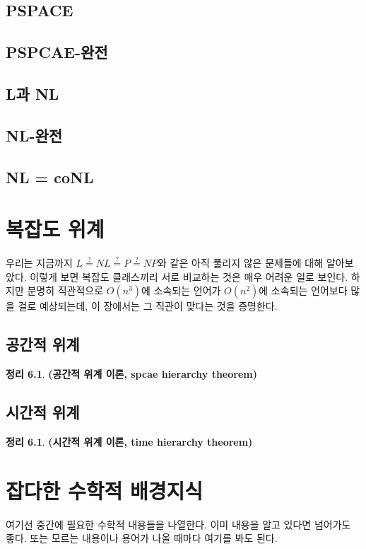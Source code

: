 \documentclass[b5paper, 10pt]{book}
\theoremstyle{definition}
\newtheorem{thm}[defn]{정리}
\newenvironment{pf*}{\pushQED{\qed}\pf}{\popQED\endpf}
\begin{document}
\section{PSPACE}
\section{PSPCAE-완전}
\section{L과 NL}
\section{NL-완전}
\section{NL = coNL}
\chapter{복잡도 위계}
우리는 지금까지 $L \overset{?}{=} NL \overset{?}{=} P \overset{?}{=} NP$와 같은
아직 풀리지 않은 문제들에 대해 알아보았다. 이렇게 보면 복잡도 클래스끼리 
서로 비교하는 것은 매우 어려운 일로 보인다. 하지만 분명히 
직관적으로 $O(n^3)$에 소속되는 언어가
$O(n^2)$에 소속되는 언어보다 많을 걸로 예상되는데, 이 장에서는
그 직관이 맞다는 것을 증명한다.
\section{공간적 위계}
\begin{thm}
    \textbf{(공간적 위계 이론, spcae hierarchy theorem)}
\end{thm}
\begin{pf*}
    
\end{pf*}
\section{시간적 위계}
\begin{thm}
    \textbf{(시간적 위계 이론, time hierarchy theorem)}
\end{thm}
\begin{pf*}
    
\end{pf*}
\appendix
\chapter{잡다한 수학적 배경지식}
여기선 중간에 필요한 수학적 내용들을 나열한다. 
이미 내용을 알고 있다면 넘어가도 좋다. 또는 모르는 내용이나 용어가 나올 때마다 여기를 
봐도 된다.
\end{document}
